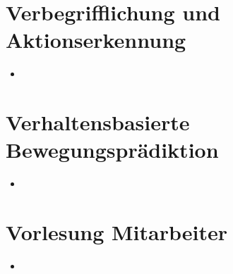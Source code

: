 \documentclass{report}
\begin{document}
	
	\section{Verbegrifflichung und Aktionserkennung}
	
	\begin{itemize}
		\item 
	\end{itemize}
	
	
	\section{Verhaltensbasierte Bewegungsprädiktion}
	
	\begin{itemize}
		\item 
	\end{itemize}
	
	
	\section{Vorlesung Mitarbeiter}
	
	\begin{itemize}
		\item 
	\end{itemize}
	
	
\end{document}
